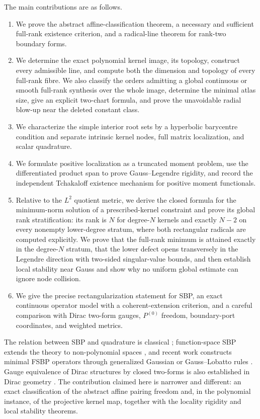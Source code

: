 \documentclass[11pt,a4paper]{article}
\theoremstyle{definition}
\theoremstyle{remark}
\begin{document}
The main contributions are as follows.
\begin{enumerate}
\item We prove the abstract affine-classification theorem, a necessary and sufficient
full-rank existence criterion, and a radical-line theorem for rank-two boundary forms.
\item We determine the exact polynomial kernel image, its topology, construct every
admissible line, and compute both the dimension and topology of every full-rank fibre.  We
also classify the orders admitting a global continuous or smooth full-rank synthesis over
the whole image, determine the minimal atlas size, give an explicit two-chart formula, and
prove the unavoidable radial blow-up near the deleted constant class.
\item We characterize the simple interior root sets by a hyperbolic barycentre condition and
separate intrinsic kernel nodes, full matrix localization, and scalar quadrature.
\item We formulate positive localization as a truncated moment problem, use the differentiated
product span to prove Gauss--Legendre rigidity, and record the independent Tchakaloff
existence mechanism for positive moment functionals.
\item Relative to the $L^2$ quotient metric, we derive the closed formula for the
minimum-norm solution of a prescribed-kernel constraint and prove its global rank
stratification: its rank is $N$ for degree-$N$ kernels and exactly $N-2$ on every nonempty
lower-degree stratum, where both rectangular radicals are computed explicitly.  We prove
that the full-rank minimum is attained exactly in the degree-$N$ stratum, that the lower
defect opens transversely in the Legendre direction with two-sided singular-value bounds,
and then establish local
stability near Gauss and show why no uniform global estimate can ignore node collision.
\item We give the precise rectangularization statement for SBP, an exact continuous operator
model with a coherent-extension criterion, and a careful comparison with Dirac two-form
gauges, $P^{(0)}$ freedom, boundary-port coordinates, and weighted metrics.
\end{enumerate}

The relation between SBP and quadrature is classical
\cite{hickenzingg2013,delrey2014}; function-space SBP extends the theory to non-polynomial
spaces \cite{glaubitz2023}, and recent work constructs minimal FSBP operators through
generalized Gaussian or Gauss--Lobatto rules \cite{hale2026,bercik2026}.  Gauge equivalence
of Dirac structures by closed two-forms is also established in Dirac geometry
\cite{bursztynradko2003}.  The contribution claimed here is narrower and different: an exact
classification of the abstract affine pairing freedom and, in the polynomial instance, of the
projective kernel map, together with the locality rigidity and local stability theorems.
\end{document}
